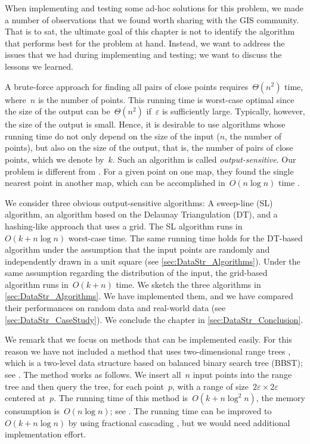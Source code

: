 When implementing and testing some ad-hoc solutions 
for this problem, 
we made a number of observations 
that we found worth sharing with the GIS community. 
That is to sat, the ultimate goal of this chapter 
is not to identify the algorithm 
that performs best for the problem at hand. 
Instead, we want to address the issues 
that we had during implementing and testing; 
we want to discuss the lessons we learned.


A brute-force approach for finding all pairs of close points 
requires~$\Theta (n^{2})$ time, 
where~$n$ is the number of points. 
This running time is worst-case optimal 
since the size of the output can be~$\Theta (n^{2})$ 
if~$\varepsilon$ is sufficiently large. 
Typically, however, the size of the output is small. 
Hence, it is desirable to use algorithms 
whose running time do not only depend on 
the size of the input ($n$, the number of points), 
but also on the size of the output, that is, 
the number of pairs of close points, 
which we denote by~$k$. 
Such an algorithm is called \emph{output-sensitive}. 
Our problem is different from \textcite{Saalfeld1988}. 
For a given point on one map, they found the 
single nearest point in another map,
which can be accomplished in~$O(n\log n)$ time 
\parencite{Shamos1975}.

We consider three obvious output-sensitive algorithms: 
A sweep-line (SL) algorithm, 
an algorithm based on the Delaunay Triangulation (DT), and 
a hashing-like approach that uses a grid. 
The SL algorithm runs in~$O(k+n\log n)$ worst-case time.
The same running time holds for the DT-based algorithm 
under the assumption that 
the input points are randomly and independently drawn 
in a unit square (see \sect\ref{sec:DataStr_Algorithms}). 
Under the same assumption 
regarding the distribution of the input, 
the grid-based algorithm runs in~$O(k+n)$ time. 
We sketch the three algorithms in 
\sect\ref{sec:DataStr_Algorithms}. 
We have implemented them, and 
we have compared their performances on random data 
and real-world data (see \sect\ref{sec:DataStr_CaseStudy}). 
We conclude the chapter in \sect\ref{sec:DataStr_Conclusion}.



We remark that we focus on methods 
that can be implemented easily.
For this reason we have not included a method that uses 
two-dimensional range trees
\parencite{Bentley1977Multivariate,Lueker1978,Lee1980Tree}, 
which is a two-level data structure based on
balanced binary search tree (BBST);
see \textcite[]{Cormen2009}.
The method works as follows. 
We insert all~$n$ input points into the range tree 
and then query the tree, for each point~$p$, 
with a range of size~$2\varepsilon \times 2\varepsilon$ 
centered at~$p$.
The running time of this method is~$O(k+n\log ^{2}n)$, the 
memory consumption is~$O(n\log n)$;
see \textcite{Bentley1977Multivariate,}. 
The running time can be improved to~$O(k+n\log n)$ 
by using fractional cascading
\parencite[]{deBerg2008}, 
but we would need additional implementation effort.





